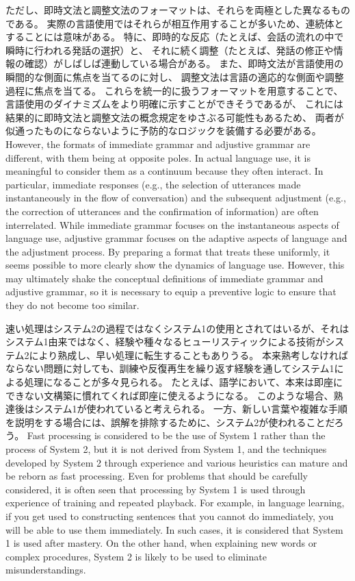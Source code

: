 \documentclass[a4paper,xelatex,ja=standard]{bxjsarticle}
\begin{document}
\ifJPN
ただし、即時文法と調整文法のフォーマットは、それらを両極とした異なるものである。
実際の言語使用ではそれらが相互作用することが多いため、連続体とすることには意味がある。
特に、即時的な反応（たとえば、会話の流れの中で瞬時に行われる発話の選択）と、
それに続く調整（たとえば、発話の修正や情報の確認）がしばしば連動している場合がある。
また、即時文法が言語使用の瞬間的な側面に焦点を当てるのに対し、
調整文法は言語の適応的な側面や調整過程に焦点を当てる。
これらを統一的に扱うフォーマットを用意することで、
言語使用のダイナミズムをより明確に示すことができそうであるが、
これには結果的に即時文法と調整文法の概念規定をゆさぶる可能性もあるため、
両者が似通ったものにならないように予防的なロジックを装備する必要がある。
\else
However, the formats of immediate grammar and adjustive grammar are different, with them being at opposite poles.
In actual language use, it is meaningful to consider them as a continuum because they often interact.
In particular, immediate responses (e.g., the selection of utterances made instantaneously in the flow of conversation) and the subsequent adjustment (e.g., the correction of utterances and the confirmation of information) are often interrelated.
While immediate grammar focuses on the instantaneous aspects of language use, adjustive grammar focuses on the adaptive aspects of language and the adjustment process.
By preparing a format that treats these uniformly, it seems possible to more clearly show the dynamics of language use.
However, this may ultimately shake the conceptual definitions of immediate grammar and adjustive grammar, so it is necessary to equip a preventive logic to ensure that they do not become too similar.
\fi

\ifJPN
速い処理はシステム2の過程ではなくシステム1の使用とされてはいるが、それはシステム1由来ではなく、経験や種々なるヒューリスティックによる技術がシステム2により熟成し、早い処理に転生することもありうる\autocite{Evans2008}。
本来熟考しなければならない問題に対しても、訓練や反復再生を繰り返す経験を通してシステム1による処理になることが多々見られる。
たとえば、語学において、本来は即座にできない文構築に慣れてくれば即座に使えるようになる。
このような場合、熟達後はシステム1が使われていると考えられる。
一方、新しい言葉や複雑な手順を説明をする場合には、誤解を排除するために、システム2が使われることだろう。
\else
  Fast processing is considered to be the use of System 1 rather than the process of System 2, but it is not derived from System 1, and the techniques developed by System 2 through experience and various heuristics can mature and be reborn as fast processing.\autocite{Evans2008}
Even for problems that should be carefully considered, it is often seen that processing by System 1 is used through experience of training and repeated playback.
For example, in language learning, if you get used to constructing sentences that you cannot do immediately, you will be able to use them immediately.
In such cases, it is considered that System 1 is used after mastery.
On the other hand, when explaining new words or complex procedures, System 2 is likely to be used to eliminate misunderstandings.
\fi
\end{document}
